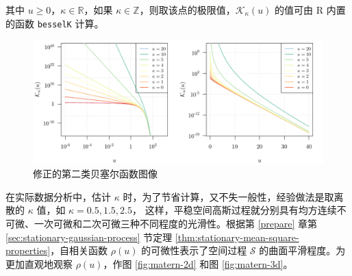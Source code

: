 \documentclass[12pt,a4paper,UTF8,twoside]{book}
\theoremstyle{definition}
\theoremstyle{definition}
\theoremstyle{definition}
\theoremstyle{remark}
\begin{document}
\noindent 其中 \(u \geq 0\)，\(\kappa \in \mathbb{R}\)，如果 \(\kappa \in \mathbb{Z}\)，则取该点的极限值，\(\mathcal{K}_{\kappa}(u)\) 的值可由 R 内置的函数 \texttt{besselK} 计算。

\begin{figure}

{\centering \includegraphics[width=0.7\linewidth]{figures/bessel} 

}

\caption{修正的第二类贝塞尔函数图像}\label{fig:bessel-function}
\end{figure}



在实际数据分析中，估计 \(\kappa\) 时，为了节省计算，又不失一般性，经验做法是取离散的 \(\kappa\) 值，如 \(\kappa = 0.5, 1.5, 2.5\)， 这样，平稳空间高斯过程就分别具有均方连续不可微、一次可微和二次可微三种不同程度的光滑性。根据第 \ref{prepare} 章第 \ref{sec:stationary-gaussian-process} 节定理 \ref{thm:stationary-mean-square-properties}，自相关函数 \(\rho(u)\) 的可微性表示了空间过程 \(\mathcal{S}\) 的曲面平滑程度。为更加直观地观察 \(\rho(u)\)，作图 \ref{fig:matern-2d} 和图 \ref{fig:matern-3d}。
\end{document}
